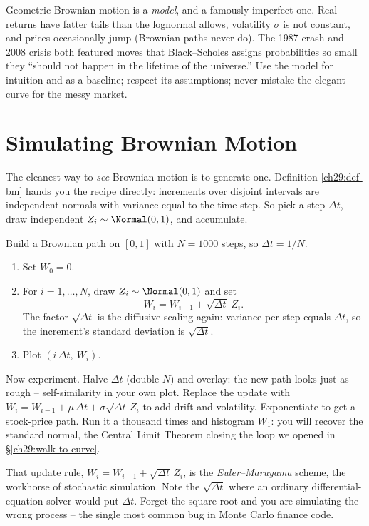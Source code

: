 \begin{trapbox}
Geometric Brownian motion is a \emph{model}, and a famously imperfect one. Real
returns have fatter tails than the lognormal allows, volatility $\sigma$ is not
constant, and prices occasionally jump (Brownian paths never do). The 1987 crash
and 2008 crisis both featured moves that Black--Scholes assigns probabilities so
small they ``should not happen in the lifetime of the universe.'' Use the model
for intuition and as a baseline; respect its assumptions; never mistake the
elegant curve for the messy market.
\end{trapbox}

\section{Simulating Brownian Motion}
\label{ch29:simulate}

The cleanest way to \emph{see} Brownian motion is to generate one. Definition
\ref{ch29:def-bm} hands you the recipe directly: increments over disjoint
intervals are independent normals with variance equal to the time step. So pick a
step $\Delta t$, draw independent $Z_i\sim\Normal(0,1)$, and accumulate.

\begin{labbox}
Build a Brownian path on $[0,1]$ with $N=1000$ steps, so $\Delta t = 1/N$.
\begin{enumerate}
  \item Set $W_0 = 0$.
  \item For $i=1,\dots,N$, draw $Z_i\sim\Normal(0,1)$ and set
  \[
    W_i = W_{i-1} + \sqrt{\Delta t}\; Z_i.
  \]
  The factor $\sqrt{\Delta t}$ is the diffusive scaling again: variance per step
  equals $\Delta t$, so the increment's standard deviation is $\sqrt{\Delta t}$.
  \item Plot $(i\,\Delta t,\ W_i)$.
\end{enumerate}
Now experiment. Halve $\Delta t$ (double $N$) and overlay: the new path looks just
as rough -- self-similarity in your own plot. Replace the update with
$W_i = W_{i-1} + \mu\,\Delta t + \sigma\sqrt{\Delta t}\,Z_i$ to add drift and
volatility. Exponentiate to get a stock-price path. Run it a thousand times and
histogram $W_1$: you will recover the standard normal, the Central Limit Theorem
closing the loop we opened in \S\ref{ch29:walk-to-curve}.
\end{labbox}

\begin{remark}
That update rule, $W_i = W_{i-1} + \sqrt{\Delta t}\,Z_i$, is the
\emph{Euler--Maruyama} scheme, the workhorse of stochastic simulation. Note the
$\sqrt{\Delta t}$ where an ordinary differential-equation solver would put
$\Delta t$. Forget the square root and you are simulating the wrong process --
the single most common bug in Monte Carlo finance code.
\end{remark}

